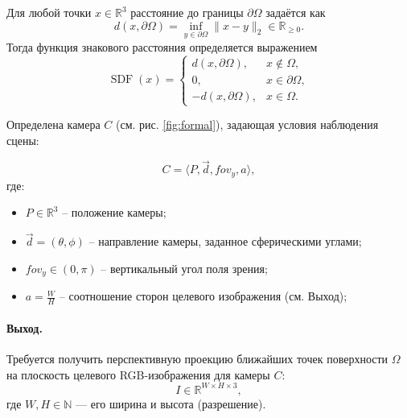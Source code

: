 Для любой точки \(x \in \mathbb{R}^3\) расстояние до границы \(\partial\Omega\) задаётся как
\[
d(x,\partial\Omega) = \inf_{y \in \partial\Omega} \lVert x - y \rVert_2 \in \mathbb{R}_{\ge 0}.
\]
Тогда функция знакового расстояния определяется выражением
\[
\operatorname{SDF}(x) =
\begin{cases}
 d(x,\partial\Omega),   & x \notin \Omega,\\[2pt]
 0,                     & x \in \partial\Omega,\\[2pt]
 -d(x,\partial\Omega),  & x \in \Omega.
\end{cases}
\]

Определена камера $C$ (см. рис. \ref{fig:formal}), задающая условия наблюдения сцены:

\[
  C = \langle P, \vec{d}, {fov}_{y}, a \rangle,
\]
где:
\begin{itemize}
    \item $P \in \mathbb{R}^3$ -- положение камеры;
    \item $\vec{d} = (\theta, \phi)$ -- направление камеры, заданное сферическими углами;
    \item ${fov}_{y} \in (0, \pi)$ -- вертикальный угол поля зрения;
    \item $a = \frac{W}{H}$ -- соотношение сторон целевого изображения (см. Выход);
\end{itemize}

\paragraph{Выход.}
Требуется получить перспективную проекцию ближайших точек поверхности $\Omega$ на плоскость целевого RGB-изображения для камеры $C$:
\[
I \in \mathbb{R}^{W \times H \times 3},
\]
где \(W,H \in \mathbb{N}\) --- его ширина и высота (разрешение).


